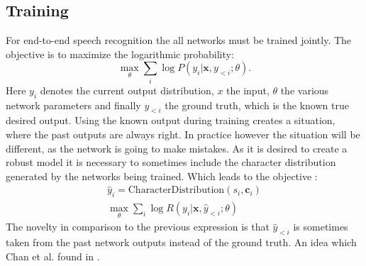 \subsection{Training}
For end-to-end speech recognition the all networks must be trained jointly. The objective is to maximize the logarithmic probability:
\begin{equation}
\max\limits_\theta \sum\limits_{i} \log P(y_i | \mathbf{x}, y_{<i};\theta).
\end{equation}
Here $y_i$ denotes the current output distribution, $x$ the input, $\theta$ the various network parameters and finally $y_{<i}$ the ground truth, which is the known true desired output.
Using the known output during training creates a situation, where the past outputs are always right. In practice however the situation will be different, as the network is going to make mistakes. As it is desired to create a robust model it is necessary to sometimes include the character distribution generated by the networks being trained.
Which leads to the objective \cite[page 5]{Chan2015}:
\begin{align}
\hat{y}_{i} = \text{CharacterDistribution}(s_i,\textbf{c}_i) \\
\max_{\theta} \sum\limits_{i} \log R(y_i|\mathbf{x},\hat{y}_{<i};\theta)
\end{align}
The novelty in comparison to the previous expression is that $\hat{y}_{<i}$ is sometimes taken from the past network outputs instead of the ground truth. An idea which Chan et al. found in \cite{Bengio2015}.

